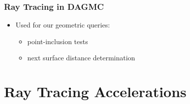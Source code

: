 \documentclass[12pt]{beamer}
\begin{document}
\begin{frame}

\frametitle{Ray Tracing in DAGMC}

\begin{itemize}
  \item Used for our geometric queries:
    \begin{itemize}
      \item point-inclusion tests
      \item next surface distance determination
    \end{itemize}
\end{itemize}


\end{frame}

\section{Ray Tracing Accelerations} %
\end{document}
